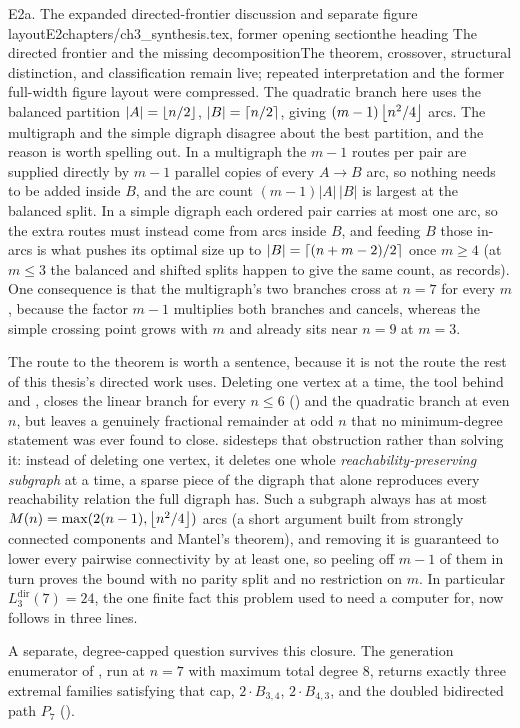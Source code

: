\begin{offcut}{E2a. The expanded directed-frontier discussion and separate figure layout}{E2}{chapters/ch3\_synthesis.tex, former opening section}{the heading The directed frontier and the missing decomposition}{The theorem, crossover, structural distinction, and classification remain live; repeated interpretation and the former full-width figure layout were compressed.}
The quadratic branch here uses the balanced partition $|A| = \left\lfloor n/2 \right\rfloor$, $|B| = \left\lceil n/2 \right\rceil$, giving $(m-1)\left\lfloor n^2/4 \right\rfloor$ arcs. The multigraph and the simple digraph disagree about the best partition, and the reason is worth spelling out. In a multigraph the $m-1$ routes per pair are supplied directly by $m-1$ parallel copies of every $A \to B$ arc, so nothing needs to be added inside $B$, and the arc count $(m-1)|A|\,|B|$ is largest at the balanced split. In a simple digraph each ordered pair carries at most one arc, so the extra routes must instead come from arcs inside $B$, and feeding $B$ those in-arcs is what pushes its optimal size up to $|B| = \left\lceil (n+m-2)/2 \right\rceil$ once $m \ge 4$ (at $m \le 3$ the balanced and shifted splits happen to give the same count, as  records). One consequence is that the multigraph's two branches cross at $n = 7$ for every $m$, because the factor $m-1$ multiplies both branches and cancels, whereas the simple crossing point grows with $m$ and already sits near $n = 9$ at $m = 3$.

The route to the theorem is worth a sentence, because it is not the route the rest of this thesis's directed work uses. Deleting one vertex at a time, the tool behind  and , closes the linear branch for every $n \le 6$ () and the quadratic branch at even $n$, but leaves a genuinely fractional remainder at odd $n$ that no minimum-degree statement was ever found to close.  sidesteps that obstruction rather than solving it: instead of deleting one vertex, it deletes one whole \emph{reachability-preserving subgraph} at a time, a sparse piece of the digraph that alone reproduces every reachability relation the full digraph has. Such a subgraph always has at most $M(n) = \max(2(n-1), \left\lfloor n^2/4 \right\rfloor)$ arcs (a short argument built from strongly connected components and Mantel's theorem), and removing it is guaranteed to lower every pairwise connectivity by at least one, so peeling off $m-1$ of them in turn proves the bound with no parity split and no restriction on $m$. In particular $L_3^{\mathrm{dir}}(7) = 24$, the one finite fact this problem used to need a computer for, now follows in three lines.

A separate, degree-capped question survives this closure. The generation enumerator of , run at $n=7$ with maximum total degree $8$, returns exactly three extremal families satisfying that cap, $2 \cdot B_{3,4}$, $2 \cdot B_{4,3}$, and the doubled bidirected path $P_7$ ().


\end{offcut}
